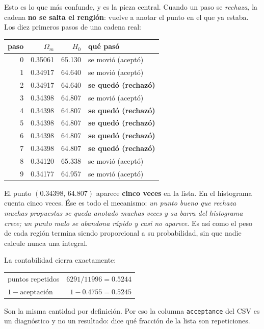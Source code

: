 \documentclass[11pt,a4paper]{article}
\newcommand{\Cl}[1]{\textcolor{clasico}{\textbf{#1}}}
\begin{document}
Esto es lo que más confunde, y es la pieza central. Cuando un paso se
\emph{rechaza}, la cadena \textbf{no se salta el renglón}: vuelve a anotar el
punto en el que ya estaba. Los diez primeros pasos de una cadena real:

\begin{center}
\small
\begin{tabular}{rrrl}
\toprule
paso & $\Omega_m$ & $H_0$ & qué pasó \\
\midrule
0 & 0.35061 & 65.130 & se movió (aceptó) \\
1 & 0.34917 & 64.640 & se movió (aceptó) \\
2 & 0.34917 & 64.640 & \Cl{se quedó (rechazó)} \\
3 & 0.34398 & 64.807 & se movió (aceptó) \\
4 & 0.34398 & 64.807 & \Cl{se quedó (rechazó)} \\
5 & 0.34398 & 64.807 & \Cl{se quedó (rechazó)} \\
6 & 0.34398 & 64.807 & \Cl{se quedó (rechazó)} \\
7 & 0.34398 & 64.807 & \Cl{se quedó (rechazó)} \\
8 & 0.34120 & 65.338 & se movió (aceptó) \\
9 & 0.34177 & 64.957 & se movió (aceptó) \\
\bottomrule
\end{tabular}
\end{center}

\noindent
El punto $(0.34398,\,64.807)$ aparece \textbf{cinco veces} en la lista. En el
histograma cuenta cinco veces. Ése es todo el mecanismo: \emph{un punto bueno
que rechaza muchas propuestas se queda anotado muchas veces y su barra del
histograma crece; un punto malo se abandona rápido y casi no aparece.} Es así
como el peso de cada región termina siendo proporcional a su probabilidad, sin
que nadie calcule nunca una integral.

La contabilidad cierra exactamente:

\begin{center}
\small
\begin{tabular}{lr}
\toprule
puntos repetidos & $6291 / 11996 = 0.5244$ \\
$1 - \text{aceptación}$ & $1 - 0.4755 = 0.5245$ \\
\bottomrule
\end{tabular}
\end{center}

\noindent
Son la misma cantidad por definición. Por eso la columna
\texttt{acceptance} del CSV es un diagnóstico y no un resultado: dice qué
fracción de la lista son repeticiones.
\end{document}
